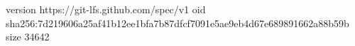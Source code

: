 version https://git-lfs.github.com/spec/v1
oid sha256:7d219606a25af41b12ee1bfa7b87dfcf7091e5ae9eb4d67e689891662a88b59b
size 34642
